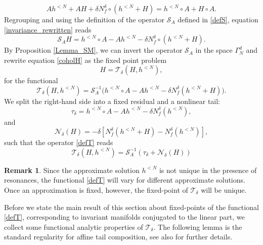 \documentclass{amsart}
\theoremstyle{plain}
\theoremstyle{definition}
\newtheorem{remark}[theorem]{Remark}
\begin{document}
\begin{equation}\label{invariance_rewritten}
    A h^{<N}+ AH + \delta N_f^\delta\circ(h^{< N}+H) = h^{< N}\circ A+H\circ A.
\end{equation}
Regrouping and using the definition of the operator $\mathcal{S}_A$ defined in \eqref{defS}, equation \eqref{invariance_rewritten} reads 
\begin{equation}\label{coholH}
\mathcal{S}_AH = h^{< N}\circ A-Ah^{< N} -\delta N_f^\delta\circ(h^{< N}+H). 
\end{equation}
By Proposition \ref{Lemma_SM}, we can invert the operator $\mathcal{S}_A$ in the space $\Gamma_{N}^d$ and rewrite equation \eqref{coholH} as the fixed point problem
\begin{equation}
H=\mathcal{T}_\delta(H,h^{< N}),
\end{equation}
for the functional
\begin{equation}\label{defT}
\mathcal{T}_\delta(H,h^{< N}) =\mathcal{S}_A^{-1}\Big(h^{< N}\circ A-Ah^{< N} -\delta N_f^\delta(h^{< N}+H)\Big).
\end{equation}
We split the right-hand side into a fixed residual and a nonlinear tail:
\begin{equation}
        \tau_\delta
        =
        h^{<N}\circ A-Ah^{<N}
        -
        \delta N_f^\delta(h^{<N}),
\end{equation}
and
\begin{equation}
        \mathcal N_\delta(H)
        =
        -\delta\left[
        N_f^\delta(h^{<N}+H)-N_f^\delta(h^{<N})
        \right],
\end{equation}
such that the operator \eqref{defT} reads
\begin{equation}
    \mathcal{T}_\delta(H,h^{<N}) =  \mathcal{S}_A^{-1}\left(\tau_\delta+\mathcal N_\delta(H)\right)
\end{equation}




\begin{remark}
    Since the approximate solution $h^{< N}$ is not unique in the presence of resonances, the functional \eqref{defT} will vary for different approximate solutions. Once an approximation is fixed, however, the fixed-point of $\mathcal{T}_\delta$ will be unique. 
\end{remark}

Before we state the main result of this section about fixed-points of the functional \eqref{defT}, corresponding to invariant manifolds conjugated to the linear part, we collect some functional analytic properties of $\mathcal{T}_\delta$. The following lemma is the standard regularity for affine tail composition, see also \cite{hille1996functional} for further details. 
\end{document}
